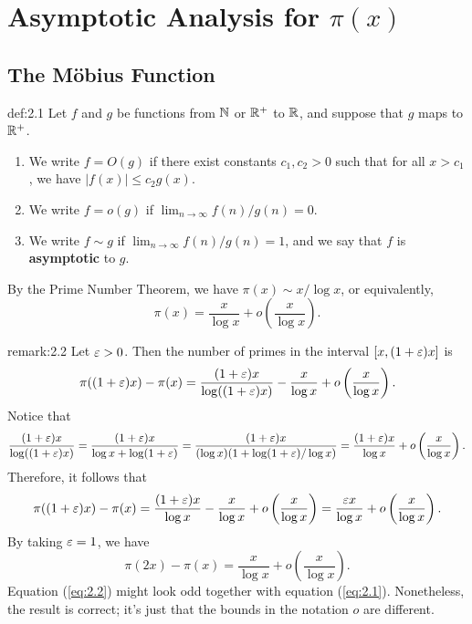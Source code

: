 \section{Asymptotic Analysis for $\pi(x)$}\label{sec:2}

\subsection{The M\"obius Function}\label{subsec:2.1}

\vspace{2ex}
\begin{defn}{def:2.1}
Let $f$ and $g$ be functions from $\mathbb{N}$ or $\mathbb{R}^+$ to $\mathbb{R}$, and suppose that $g$ maps to $\mathbb{R}^+$. 
\begin{enumerate}[(1)]
    \item We write $f = O(g)$ if there exist constants $c_1, c_2 > 0$ such that for all $x > c_1$, 
    we have $|f(x)| \leq c_2 g(x)$. 
    \item We write $f = o(g)$ if $\lim_{n\to\infty} f(n)/g(n) = 0$. 
    \item We write $f \sim g$ if $\lim_{n\to\infty} f(n)/g(n) = 1$, and we say that $f$ is 
    {\bf asymptotic} to $g$. 
\end{enumerate}
\end{defn}

By the Prime Number Theorem, we have $\pi(x) \sim x/\log x$, or equivalently, 
\begin{equation}
    \pi(x) = \frac{x}{\log x} + o\left( \frac{x}{\log x} \right). \label{eq:2.1}
\end{equation}
\begin{remark}{remark:2.2}
Let $\varepsilon > 0$. Then the number of primes in the interval $[x, (1+\varepsilon)x]$ is 
\[ \pi((1+\varepsilon)x) - \pi(x) = \frac{(1+\varepsilon)x}{\log((1+\varepsilon)x)} - \frac{x}{\log x} + o\left( \frac{x}{\log x} \right). \]
Notice that 
\[ \frac{(1+\varepsilon)x}{\log((1+\varepsilon)x)} = \frac{(1+\varepsilon)x}{\log x + \log(1+\varepsilon)} 
= \frac{(1+\varepsilon)x}{(\log x)(1 + \log(1+\varepsilon)/\log x)} = \frac{(1+\varepsilon)x}{\log x} + o\left( \frac{x}{\log x} \right). \]
Therefore, it follows that 
\[ \pi((1+\varepsilon)x) - \pi(x) = \frac{(1+\varepsilon)x}{\log x} - \frac{x}{\log x} + o\left( \frac{x}{\log x} \right) = \frac{\varepsilon x}{\log x} + o\left( \frac{x}{\log x} \right). \]
By taking $\varepsilon = 1$, we have 
\begin{equation}
    \pi(2x) - \pi(x) = \frac{x}{\log x} + o\left( \frac{x}{\log x} \right). \label{eq:2.2}
\end{equation} 
Equation (\ref{eq:2.2}) might look odd together with equation (\ref{eq:2.1}). Nonetheless, the result is 
correct; it's just that the bounds in the notation $o$ are different. 
\end{remark}

